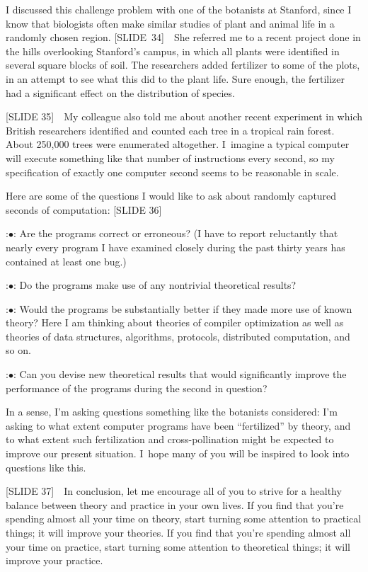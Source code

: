 I discussed this challenge problem with one of the botanists at
Stanford, since I know that biologists often make similar studies of
plant and animal life in a randomly chosen region. [SLIDE~34]\ \ She
referred me to a recent project done in the hills overlooking
Stanford's campus, in which all plants were identified in several
square blocks of soil. The researchers added fertilizer to some of the
plots, in an attempt to see what this did to the plant life. Sure
enough, the fertilizer had a significant effect on the distribution of
species. 

[SLIDE 35]\ \ My colleague also told me about another recent
experiment in which British researchers identified and counted each
tree in a tropical rain forest. About 250,000 trees were enumerated
altogether. I~imagine a typical computer will execute something like
that number of instructions every second, so my specification of
exactly one computer second seems to be reasonable in scale.

Here are some of the questions I would like to ask about randomly
captured seconds of computation: [SLIDE 36]

\smallskip
\display 30pt:$\bullet$:
Are the programs correct or erroneous? (I have to report reluctantly
that nearly every program I have examined closely during the past
thirty years has contained at least one bug.)

\smallskip
\display 30pt:$\bullet$:
Do the programs make use of any nontrivial theoretical results?

\smallskip
\display 30pt:$\bullet$:
Would the programs be substantially better if they made more use of
known theory? Here I am thinking about theories of compiler
optimization as well as theories of data structures, algorithms,
protocols, distributed computation, and so on.

\smallskip
\display 30pt:$\bullet$:
Can you devise new theoretical results that would significantly
improve the performance of the programs during the second in question?

\smallskip
\noindent
In a sense, I'm asking questions something like the botanists
considered: I'm asking to what extent computer programs have been
``fertilized'' by theory, and to what extent such fertilization and
cross-pollination might be expected to improve our present situation.
I~hope many of you will be inspired to look into questions like this.

[SLIDE 37]\ \ In conclusion, let me encourage all of you to strive for
a healthy balance between theory and practice in your own lives. If
you find that you're spending almost all your time on theory, start
turning some attention to practical things; it will improve your
theories. If you find that you're spending almost all your time on
practice, start turning some attention to theoretical things; it will
improve your practice.

